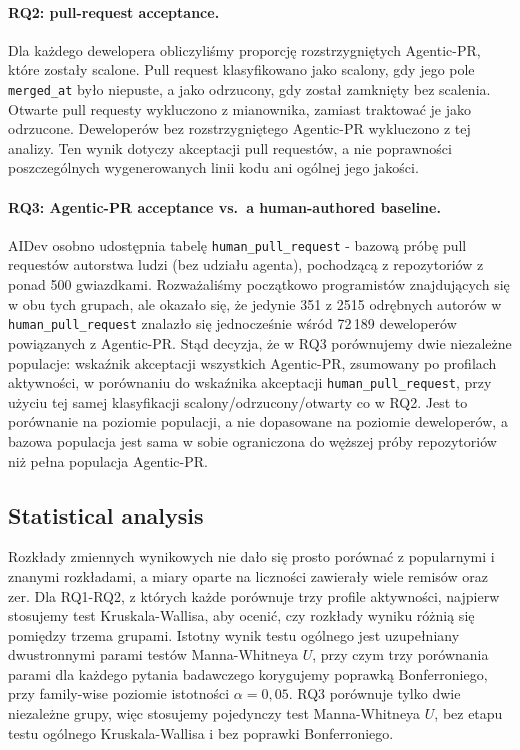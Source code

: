 \paragraph{RQ2: pull-request acceptance.}
Dla każdego dewelopera obliczyliśmy proporcję rozstrzygniętych Agentic-PR, które zostały scalone. Pull request klasyfikowano jako scalony, gdy jego pole \texttt{merged\_at} było niepuste, a jako odrzucony, gdy został zamknięty bez scalenia. Otwarte pull requesty wykluczono z mianownika, zamiast traktować je jako odrzucone. Deweloperów bez rozstrzygniętego Agentic-PR wykluczono z tej analizy. Ten wynik dotyczy akceptacji pull requestów, a nie poprawności poszczególnych wygenerowanych linii kodu ani ogólnej jego jakości.

\paragraph{RQ3: Agentic-PR acceptance vs.\ a human-authored baseline.}
AIDev osobno udostępnia tabelę \texttt{human\_pull\_request} - bazową próbę pull requestów autorstwa ludzi (bez udziału agenta), pochodzącą z repozytoriów z ponad 500 gwiazdkami. Rozważaliśmy początkowo programistów znajdujących się w obu tych grupach, ale okazało się, że jedynie 351 z 2515 odrębnych autorów w \texttt{human\_pull\_request} znalazło się jednocześnie wśród 72\,189 deweloperów powiązanych z Agentic-PR. Stąd decyzja, że w RQ3 porównujemy dwie niezależne populacje: wskaźnik akceptacji wszystkich Agentic-PR, zsumowany po profilach aktywności, w porównaniu do wskaźnika akceptacji \texttt{human\_pull\_request}, przy użyciu tej samej klasyfikacji scalony/odrzucony/otwarty co w RQ2. Jest to porównanie na poziomie populacji, a nie dopasowane na poziomie deweloperów, a bazowa populacja jest sama w sobie ograniczona do węższej próby repozytoriów niż pełna populacja Agentic-PR.

\subsection{Statistical analysis}
Rozkłady zmiennych wynikowych nie dało się prosto porównać z popularnymi i znanymi rozkładami, a miary oparte na liczności zawierały wiele remisów oraz zer. Dla RQ1-RQ2, z których każde porównuje trzy profile aktywności, najpierw stosujemy test Kruskala-Wallisa, aby ocenić, czy rozkłady wyniku różnią się pomiędzy trzema grupami. Istotny wynik testu ogólnego jest uzupełniany dwustronnymi parami testów Manna-Whitneya $U$, przy czym trzy porównania parami dla każdego pytania badawczego korygujemy poprawką Bonferroniego, przy family-wise poziomie istotności $\alpha=0,05$. RQ3 porównuje tylko dwie niezależne grupy, więc stosujemy pojedynczy test Manna-Whitneya $U$, bez etapu testu ogólnego Kruskala-Wallisa i bez poprawki Bonferroniego.

